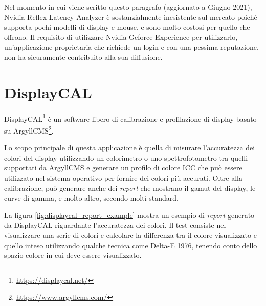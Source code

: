 Nel momento in cui viene scritto questo paragrafo (aggiornato a Giugno 2021), Nvidia Reflex Latency Analyzer è sostanzialmente inesistente sul mercato poiché supporta pochi modelli di display e mouse, e sono molto costosi per quello che offrono. Il requisito di utilizzare Nvidia Geforce Experience per utilizzarlo, un'applicazione proprietaria che richiede un login e con una pessima reputazione, non ha sicuramente contribuito alla sua diffusione.

\section{DisplayCAL}
DisplayCAL\footnote{\href{https://displaycal.net/}{https://displaycal.net/}} è un software libero di calibrazione e profilazione di display basato su ArgyllCMS\footnote{\href{https://www.argyllcms.com/}{https://www.argyllcms.com/}}.

Lo scopo principale di questa applicazione è quella di misurare l'accuratezza dei colori del display utilizzando un colorimetro o uno spettrofotometro tra quelli supportati da ArgyllCMS e generare un profilo di colore ICC che può essere utilizzato nel sistema operativo per fornire dei colori più accurati. Oltre alla calibrazione, può generare anche dei \textit{report} che mostrano il gamut del display, le curve di gamma, e molto altro, secondo molti standard.

La figura \ref{fig:displaycal_report_example} mostra un esempio di \textit{report} generato da DisplayCAL riguardante l'accuratezza dei colori. Il test consiste nel visualizzare una serie di colori e calcolare la differenza tra il colore visualizzato e quello inteso utilizzando qualche tecnica come Delta-E 1976, tenendo conto dello spazio colore in cui deve essere visualizzato.

